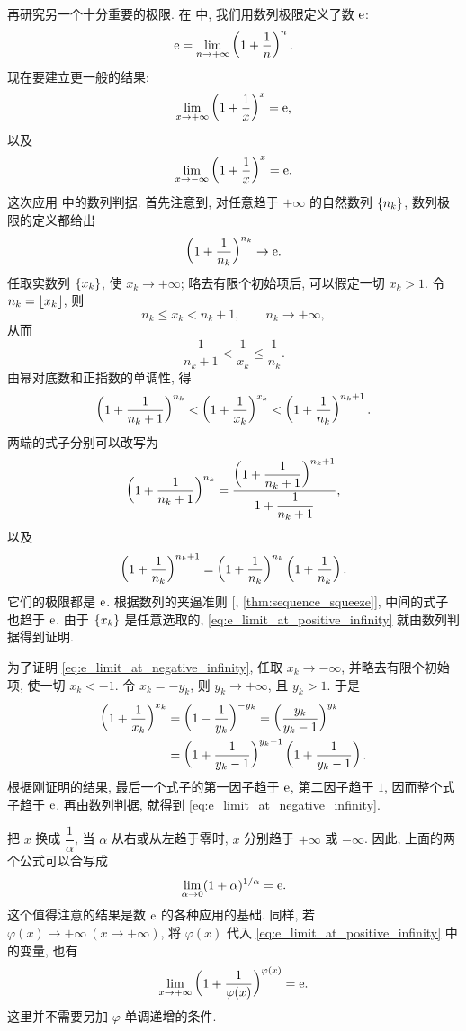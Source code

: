 \label{ex:e_limit_for_real_variable}
再研究另一个十分重要的极限. 在  中,
我们用数列极限定义了数 $\e$:
$$
\e=\lim_{n\to+\infty}\brac{1+\frac1n}^n.
$$
现在要建立更一般的结果:
\begin{equation}\label{eq:e_limit_at_positive_infinity}
\lim_{x\to+\infty}\brac{1+\frac1x}^x=\e,
\end{equation}
以及
\begin{equation}\label{eq:e_limit_at_negative_infinity}
\lim_{x\to-\infty}\brac{1+\frac1x}^x=\e.
\end{equation}
这次应用  中的数列判据.
首先注意到, 对任意趋于 $+\infty$ 的自然数列 $\seqset[k]{n}$,
数列极限的定义都给出
\begin{equation}
\brac{1+\frac1{n_k}}^{n_k}\to\e.
\end{equation}
任取实数列 $\seqset[k]{x}$, 使 $x_k\to+\infty$;
略去有限个初始项后, 可以假定一切 $x_k>1$.
令 $n_k=\floor{x_k}$, 则
$$
n_k\leqslant x_k<n_k+1,\qquad n_k\to+\infty,
$$
从而
$$
\frac1{n_k+1}<\frac1{x_k}\leqslant\frac1{n_k}.
$$
由幂对底数和正指数的单调性, 得
$$
\brac{1+\frac1{n_k+1}}^{n_k}
<\brac{1+\frac1{x_k}}^{x_k}
<\brac{1+\frac1{n_k}}^{n_k+1}.
$$
两端的式子分别可以改写为
$$
\brac{1+\frac1{n_k+1}}^{n_k}
=\frac{\brac{1+\dfrac1{n_k+1}}^{n_k+1}}{1+\dfrac1{n_k+1}},
$$
以及
$$
\brac{1+\frac1{n_k}}^{n_k+1}
=\brac{1+\frac1{n_k}}^{n_k}\brac{1+\frac1{n_k}}.
$$
它们的极限都是 $\e$. 根据数列的夹逼准则
[, \ref{thm:sequence_squeeze}], 中间的式子也趋于 $\e$.
由于 $\seqset[k]{x}$ 是任意选取的,
\eqref{eq:e_limit_at_positive_infinity} 就由数列判据得到证明.

为了证明 \eqref{eq:e_limit_at_negative_infinity}, 任取 $x_k\to-\infty$,
并略去有限个初始项, 使一切 $x_k<-1$.
令 $x_k=-y_k$, 则 $y_k\to+\infty$, 且 $y_k>1$.
于是
$$
\begin{aligned}
\brac{1+\frac1{x_k}}^{x_k}
&=\brac{1-\frac1{y_k}}^{-y_k}
=\brac{\frac{y_k}{y_k-1}}^{y_k}\\
&=\brac{1+\frac1{y_k-1}}^{y_k-1}
\brac{1+\frac1{y_k-1}}.
\end{aligned}
$$
根据刚证明的结果, 最后一个式子的第一因子趋于 $\e$,
第二因子趋于 $1$, 因而整个式子趋于 $\e$.
再由数列判据, 就得到 \eqref{eq:e_limit_at_negative_infinity}.

把 $x$ 换成 $\dfrac1\alpha$, 当 $\alpha$ 从右或从左趋于零时,
$x$ 分别趋于 $+\infty$ 或 $-\infty$.
因此, 上面的两个公式可以合写成
\begin{equation}\label{eq:e_limit_at_zero}
\lim_{\alpha\to0}(1+\alpha)^{1/\alpha}=\e.
\end{equation}
这个值得注意的结果是数 $\e$ 的各种应用的基础.
同样, 若 $\varphi(x)\to+\infty\ (x\to+\infty)$,
将 $\varphi(x)$ 代入 \eqref{eq:e_limit_at_positive_infinity} 中的变量, 也有
$$
\lim_{x\to+\infty}\brac{1+\frac1{\varphi(x)}}^{\varphi(x)}=\e.
$$
这里并不需要另加 $\varphi$ 单调递增的条件.

